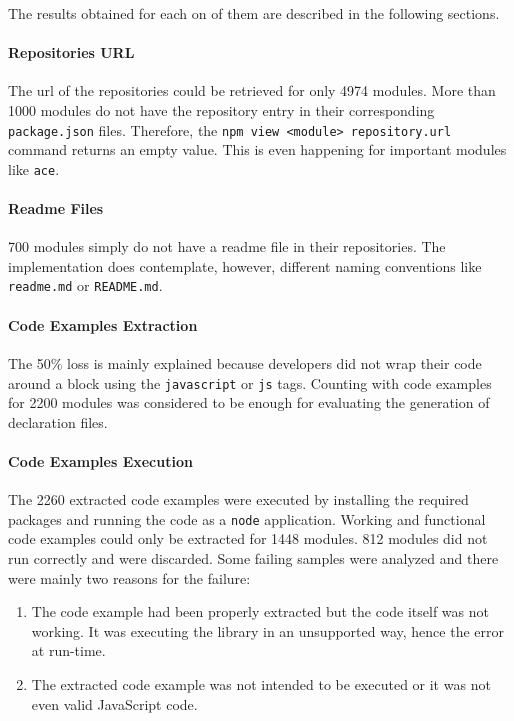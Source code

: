 \documentclass[a4paper,english,cleveref, autoref]{lipics-v2019}
\begin{document}
The results obtained for each on of them are described in the following sections.

\paragraph*{Repositories URL}
The url of the repositories could be retrieved for only 4974 modules. More than 1000 modules do not have the repository entry in their corresponding \lstinline{package.json} files. Therefore, the \lstinline{npm view <module> repository.url} command returns an empty value. This is even happening for important modules like \lstinline{ace}.

\paragraph*{Readme Files}
700 modules simply do not have a readme file in their repositories. The implementation does contemplate, however, different naming conventions like \lstinline{readme.md} or \lstinline{README.md}.

\paragraph*{Code Examples Extraction}
The 50\% loss is mainly explained because developers did not wrap their code around a block using the \lstinline{javascript} or \lstinline{js} tags. Counting with code examples for 2200 modules was considered to be enough for evaluating the generation of declaration files.

\paragraph*{Code Examples Execution}
The 2260 extracted code examples were executed by installing the required packages and running the code as a \lstinline{node} application. Working and functional code examples could only be extracted for 1448 modules. 812 modules did not run correctly and were discarded. Some failing samples were analyzed and there were mainly two reasons for the failure:
\begin{enumerate}
	\item The code example had been properly extracted but the code itself was not working. It was executing the library in an unsupported way, hence the error at run-time.
	\item The extracted code example was not intended to be executed or it was not even valid JavaScript code.
\end{enumerate}
\end{document}
